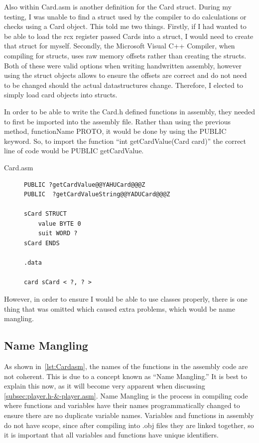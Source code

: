 \documentclass[twoside]{article}
\begin{document}
    \bigbreak
    \noindent
    Also within Card.asm is another definition for the Card struct.
    During my testing, I was unable to find a struct used by the compiler to do calculations or checks using a Card object.
    This told me two things.
    Firstly, if I had wanted to be able to load the rcx register passed Cards into a struct, I would need to create that struct for myself.
    Secondly, the Microsoft Visual C++ Compiler, when compiling for structs, uses raw memory offsets rather than creating the structs.
    Both of these were valid options when writing handwritten assembly, however using the struct objects allows to ensure the offsets are correct and do not need to be changed should the actual datastructures change.
    Therefore, I elected to simply load card objects into structs.

    \bigbreak
    \noindent
    In order to be able to write the Card.h defined functions in assembly, they needed to first be imported into the assembly file.
    Rather than using the previous method, functionName PROTO, it would be done by using the PUBLIC keyword.
    So, to import the function ``int getCardValue(Card card)'' the correct line of code would be PUBLIC getCardValue.

    \bigbreak
    \noindent
    Card.asm
    \begin{figure}[hbtp]
        \begin{lstlisting}[language=MASM,label={lst:Cardasm}]
PUBLIC ?getCardValue@@YAHUCard@@@Z
PUBLIC  ?getCardValueString@@YADUCard@@@Z

sCard STRUCT
	value BYTE 0
	suit WORD ?
sCard ENDS

.data

card sCard < ?, ? >
        \end{lstlisting}
    \end{figure}

    \noindent
    However, in order to ensure I would be able to use classes properly, there is one thing that was omitted which caused extra problems, which would be name mangling.

    \subsection{Name Mangling}\label{subsec:name-mangling}
    As shown in~\ref{lst:Cardasm}, the names of the functions in the assembly code are not coherent.
    This is due to a concept known as ``Name Mangling.''
    It is best to explain this now, as it will become very apparent when discussing \ref{subsec:player.h-&-player.asm}.
    Name Mangling is the process in compiling code where functions and variables have their names programmatically changed to ensure there are no duplicate variable names.
    Variables and functions in assembly do not have scope, since after compiling into .obj files they are linked together, so it is important that all variables and functions have unique identifiers.
\end{document}
